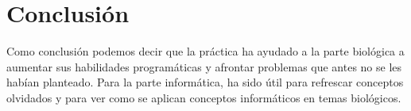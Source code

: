 \documentclass[11pt]{article} %
\begin{document}
\section{Conclusi\'on}

Como conclusi\'on podemos decir que la pr\'actica ha ayudado a la parte biol\'ogica a aumentar sus habilidades program\'aticas y afrontar problemas que antes no se les hab\'ian planteado. Para la parte inform\'atica, ha sido \'util para refrescar conceptos olvidados y para ver como se aplican conceptos inform\'aticos en temas biol\'ogicos.
\end{document}

